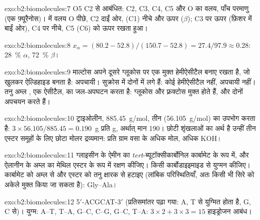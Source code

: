 \begin{solution}{exo:b2:biomolecules:7}
O5 C2 से आबंधित: C2, C3, C4, C5 और O का वलय, पाँच परमाणु (एक फ़्यूरैनोस)।  में वलय O
पीछे, C2 दाईं ओर,  (C1) नीचे और  ऊपर ($\beta$); C3 पर  ऊपर (फ़िशर में
बाईं ओर), C4 पर  नीचे, C5  (C6) को ऊपर रखता हुआ।
\end{solution}

\begin{solution}{exo:b2:biomolecules:8}
$x_\alpha = (80.2 - 52.8)/(150.7 - 52.8) = 27.4/97.9 \approx 0.28$: 28~\% $\alpha$, 72~\% $\beta$।
\end{solution}

\begin{solution}{exo:b2:biomolecules:9}
माल्टोस अपने दूसरे ग्लूकोस पर एक मुक्त हेमीऐसीटैल बनाए रखता है, जो खुलकर ऐल्डिहाइड बनता है: अपचायी। सुक्रोस में
दोनों   में लगे हैं: कोई हेमीऐसीटैल नहीं, अपचायी नहीं। तनु अम्ल
, एक ऐसीटैल, का जल-अपघटन करता है: ग्लूकोस और फ़्रक्टोस मुक्त होते हैं, और दोनों अपचयन करते हैं।
\end{solution}

\begin{solution}{exo:b2:biomolecules:10}
ट्राइओलीन, \qty{885.45}{g/mol}, तीन  (\qty{56.105}{g/mol}) का उपभोग करता है: $3 \times 56.105/885.45 =
0.190$~g प्रति g, अर्थात्  मान 190। छोटी शृंखलाओं का अर्थ है उन्हीं तीन एस्टर समूहों के लिए
छोटा मोलर द्रव्यमान: प्रति ग्राम वसा के अधिक मोल, अधिक KOH।
\end{solution}

\begin{solution}{exo:b2:biomolecules:11}
ग्लाइसीन के ऐमीन का \textit{tert}-ब्यूटॉक्सीकार्बोनिल कार्बामेट के रूप में, और ऐलानीन के अम्ल का
मेथिल एस्टर के रूप में रक्षण कीजिए। किसी कार्बोडाइइमाइड से युग्मन कीजिए। कार्बामेट को अम्ल से और एस्टर को तनु क्षारक से हटाइए
(लांबिक परिस्थितियाँ, अतः किसी भी सिरे को अकेले मुक्त किया जा सकता है): Gly--Ala।
\end{solution}

\begin{solution}{exo:b2:biomolecules:12}
5$'$-ACGCAT-3$'$ (प्रतिसमांतर पढ़ा गया: A, T से युग्मित होता है, G, C से)। युग्म: A--T, T--A, G--C, C--G, G--C, T--A:
$3 \times 2 + 3 \times 3 = 15$ हाइड्रोजन आबंध।
\end{solution}

